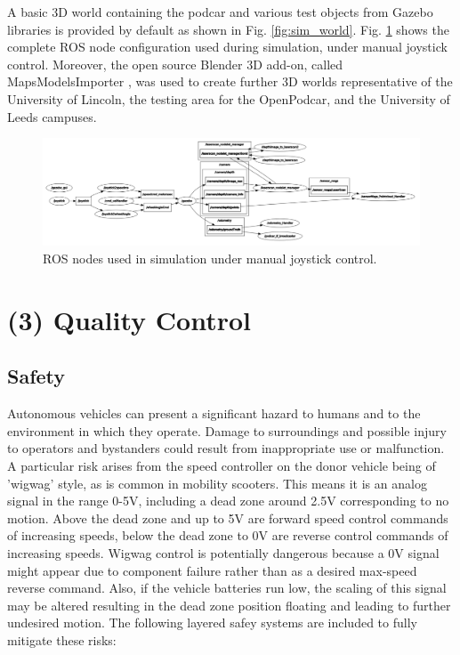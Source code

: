 \documentclass[a4paper]{article}
\begin{document}
	A basic 3D world containing the podcar and various test objects from Gazebo libraries is provided by default as shown in Fig. \ref{fig:sim_world}. Fig. \ref{fig:sim_nodes} shows the complete ROS node configuration used during simulation, under manual joystick control. Moreover, the open source Blender 3D add-on, called MapsModelsImporter \cite{michelmaps}, was used to create further 3D worlds representative of the University of Lincoln, the testing area for the OpenPodcar, and the University of Leeds campuses.
	
	\begin{figure}[h]
		\includegraphics[width=\columnwidth]{figs_sim/sim_nodes.png}
		\caption{ROS nodes used in simulation under manual joystick control.}
		\label{fig:sim_nodes}
	\end{figure}
	
	\section{(3) Quality Control}\label{h.f8237gmzmwc6}
	
	\subsection{Safety}\label{h.v60aduckfisj}
	
	Autonomous vehicles can present a significant hazard to humans and to the environment in which they operate. Damage to surroundings and possible injury to operators and bystanders could result from inappropriate use or malfunction. A particular risk arises from the speed controller on the donor vehicle being of 'wigwag' style, as is common in mobility scooters. This means it is an analog signal in the range 0-5V, including a dead zone around 2.5V corresponding to no motion. Above the dead zone and up to 5V are forward speed control commands of increasing speeds, below the dead zone to 0V are reverse control commands of increasing speeds. Wigwag control is  potentially dangerous because a 0V signal might appear due to component failure rather than as a desired max-speed reverse command. Also, if the vehicle batteries run low, the scaling of this signal may be altered resulting in the dead zone position floating and leading to further undesired motion. The following layered safey systems are included to fully mitigate these risks:
	
\end{document}
